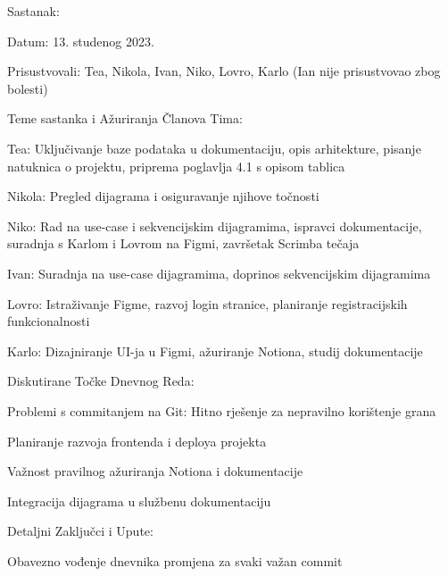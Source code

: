 \begin{packed_enum}
\vspace{30pt}

\item Sastanak:
    \item[] \begin{packed_item}
        \item Datum: 13. studenog 2023.
        \item Prisustvovali: Tea, Nikola, Ivan, Niko, Lovro, Karlo (Ian nije prisustvovao zbog bolesti)
        \item Teme sastanka i Ažuriranja Članova Tima:
            \begin{packed_item}
                \item Tea: Uključivanje baze podataka u dokumentaciju, opis arhitekture, pisanje natuknica o projektu, priprema poglavlja 4.1 s opisom tablica
                \item Nikola: Pregled dijagrama i osiguravanje njihove točnosti
                \item Niko: Rad na use-case i sekvencijskim dijagramima, ispravci dokumentacije, suradnja s Karlom i Lovrom na Figmi, završetak Scrimba tečaja
                \item Ivan: Suradnja na use-case dijagramima, doprinos sekvencijskim dijagramima
                \item Lovro: Istraživanje Figme, razvoj login stranice, planiranje registracijskih funkcionalnosti
                \item Karlo: Dizajniranje UI-ja u Figmi, ažuriranje Notiona, studij dokumentacije
            \end{packed_item}
        \item Diskutirane Točke Dnevnog Reda:
            \begin{packed_item}
                \item Problemi s commitanjem na Git: Hitno rješenje za nepravilno korištenje grana
                \item Planiranje razvoja frontenda i deploya projekta
                \item Važnost pravilnog ažuriranja Notiona i dokumentacije
                \item Integracija dijagrama u službenu dokumentaciju
            \end{packed_item}
        \item Detaljni Zaključci i Upute:
            \begin{packed_item}
                \item Obavezno vođenje dnevnika promjena za svaki važan commit

\end{packed_item}
\end{packed_item}
\end{packed_enum}
